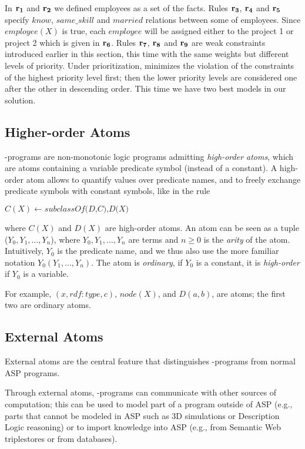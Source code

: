 \documentclass[a4paper, titlepage]{article}
\newcommand\mycenterline[1]{\par\smallskip\centerline{#1} \smallskip}
\newcommand{\row}[1]{%
  \ensuremath{\color{black}\ensuremath{\mathbf{#1}} \color{black}}%
}
\begin{document}
{In $\row{r_1}$ and $\row{r_2}$ we defined employees as a set of the 
facts. Rules $\row{r_3}$, $\row{r_4}$ and $\row{r_5}$ specify $\mathit{know}$, 
$\mathit{same\_skill}$ and $\mathit{married}$ relations 
between some of employees. Since $\mathit{employee}(X)$ is 
true, each $\mathit{employee}$ will be assigned either to 
the project 1 or project 2 which is given in $\row{r_6}$. Rules $\row{r_7}$, $\row{r_8}$ and $\row{r_9}$ 
are weak constraints introduced earlier in this section, this time with the 
same weights but different levels of priority. Under 
prioritization, \dlvhex{} minimizes the violation of 
the constraints of the highest priority level first; then 
the lower priority levels are considered one after the 
other in descending order. This time we have two best 
models in our solution.     
}

\subsection{Higher-order Atoms}
\hex{}-programs are non-monotonic logic programs
admitting \emph{high-order atoms},
which are atoms containing a variable predicate symbol
(instead of a constant).
A high-order atom allows to quantify values over predicate names, and to 
freely exchange predicate symbols with constant symbols, 
like in the rule
%
\mycenterline{$C(X) \leftarrow \textit{subclassOf(D,C),D(X)}$}
%
where $C(X)$ and $D(X)$ are high-order atoms.
%
An atom can be seen as a tuple ($Y_0, Y_1, \dots,Y_n$),
where $Y_0, Y_1,\dots,Y_n$ are terms
and $ n \ge 0$ is the \textit{arity} of the atom.
Intuitively, $Y_0$ is the predicate name, and we thus also use the more 
familiar notation $Y_0(Y_1,\dots,Y_n)$. The atom is 
\textit{ordinary}, if $Y_0$ is a constant,
it is \textit{high-order} if $Y_0$ is a variable.

For example, 
$(x,rdf:type,c)$, $node(X)$, and $D(a,b)$, are atoms; the 
first two are ordinary atoms.


\subsection{External Atoms}
\label{extatoms}
External atoms are the central feature
that distinguishes \hex-programs from normal ASP programs.

Through external atoms, \hex{}-programs can communicate 
with other sources of computation;
this can be used to model part of a program outside of ASP
(e.g., parts that cannot be modeled in ASP
such as 3D simulations or Description Logic reasoning)
or to import knowledge into ASP
(e.g., from Semantic Web triplestores or from databases).
\end{document}

